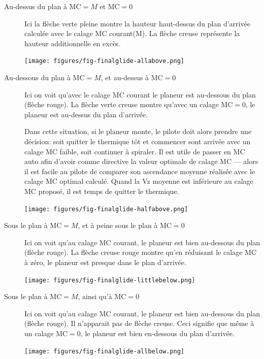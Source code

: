 \begin{description}

\item[Au-dessus du plan à MC$=M$ et MC$=0$]
  Ici la flèche verte pleine montre la hauteur haut-dessus du plan d'arrivée calculée avec le calage MC courant(M). La flèche creuse représente la hauteur additionnelle en excès.

\begin{center}
\texttt{[image: figures/fig-finalglide-allabove.png]}
\end{center}

\item[Au-dessous du plan à MC$=M$, et au-dessus à MC$=0$]
  Ici on voit qu'avec le calage MC courant le planeur est au-dessous du plan (flèche rouge). La flèche verte creuse montre qu'avec un calage MC$=0$, le planeur est au-dessus du plan d'arrivée.  

Dans cette situation, si le planeur monte, le pilote doit alors prendre une décision: soit quitter le thermique tôt et commencer sont arrivée avec un calage MC faible, soit continuer à spiraler. Il est utile de passer en MC auto afin d'avoir comme directive la valeur optimale de calage MC  --- alors il est facile au pilote de comparer son ascendance moyenne réalisée avec le calage MC optimal calculé. Quand la Vz moyenne est inférieure au calage MC proposé, il est temps de quitter le thermique.

\begin{center}
\texttt{[image: figures/fig-finalglide-halfabove.png]}
\end{center}

\item[Sous le plan à MC$=M$, et à peine sous le plan à MC$=0$]
  Ici on voit qu'au calage MC courant, le planeur est bien au-dessous du plan (flèche rouge). La flèche creuse rouge montre qu'en réduisant le calage MC à zéro, le planeur est presque dans le plan d'arrivée.
\begin{center}
\texttt{[image: figures/fig-finalglide-littlebelow.png]}
\end{center}

\item[Sous le plan à MC$=M$, ainsi qu'à  MC$=0$]
  Ici on voit qu'au calage MC courant, le planeur est bien au-dessous du plan (flèche rouge). Il n'apparait pas de flèche creuse. Ceci signifie que même à un calage MC$=0$, le planeur est bien en-dessous du plan d'arrivée.
\begin{center}
\texttt{[image: figures/fig-finalglide-allbelow.png]}
\end{center}
\end{description}
 

